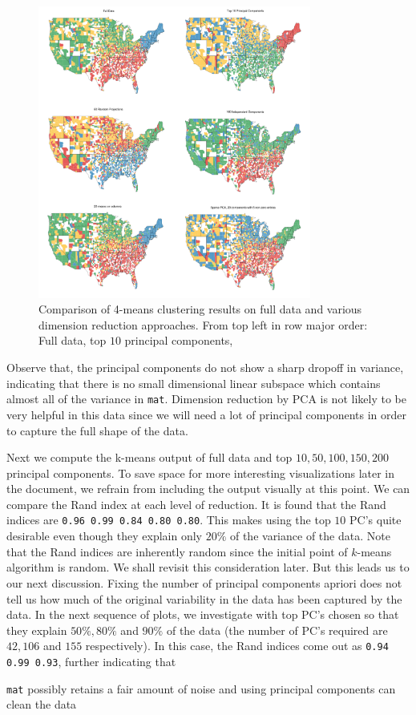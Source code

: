 \begin{figure}[ht]
	\centering
	\includegraphics[width=0.8\textwidth]{fig/plot2to6.png}
	\caption{Comparison of 4-means clustering results on full data and various dimension reduction approaches. From top left in row major order: Full data, top $10$ principal components,}
	\label{fig:allplots}
\end{figure}

Observe that, the principal components do not show a sharp dropoff in variance, indicating that there is no small dimensional linear subspace which contains almost all of the variance in \verb|mat|. Dimension reduction by PCA is not likely to be very helpful in this data since we will need a lot of principal components in order to capture the full shape of the data.

Next we compute the k-means output of full data and top $10, 50, 100, 150, 200$ principal components. To save space for more interesting visualizations later in the document, we refrain from including the output visually at this point. We can compare the Rand index at each level of reduction. It is found that the Rand indices are \verb|0.96 0.99 0.84 0.80 0.80|. This makes using the top $10$ PC's quite desirable even though they explain only $20\%$ of the variance of the data. Note that the Rand indices are inherently random since the initial point of $k$-means algorithm is random. We shall revisit this consideration later. But this leads us to our next discussion. Fixing the number of principal components apriori does not tell us how much of the original variability in the data has been captured by the data. In the next sequence of plots, we investigate with top PC's chosen so that they explain $50\%, 80\%$ and $90\%$ of the data (the number of PC's required are $42, 106$ and $155$ respectively). In this case, the Rand indices come out as \verb|0.94 0.99 0.93|, further indicating that
\begin{center}
\verb|mat| possibly retains a fair amount of noise and using principal components can clean the data
\end{center}

